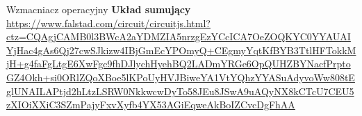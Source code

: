 \begin{frame}{Wzmacniacz operacyjny}
	\textbf{Układ sumujący}\\
	\url{https://www.falstad.com/circuit/circuitjs.html?ctz=CQAgjCAMB0l3BWcA2aYDMZIA5nrzgEzYCcICA7OeZOQKYC0YYAUAIYjHac4gAs6Qj27cwSJkizw4IBjGmEcYPOmyQ+CEgmyYqtKfBYB3TtlHFTokkMjH+g4faFgLtgE6XwFgc9fhDJlychHyehBQ2LADmYRGe6OpQUHZBYNacfPrptoGZ4Okh+si0ORlZQoXBoe5lKPoUyHVJBiweYA1VtYQhzYYASuAdyvoWw808tEglUNAILAPtjd2hLtzLSRW0NkkwcwDyTo58JEu8JSwA9uAQyNX8kCTcU7CEU5zXIOiXXiC3SZmPajyFxvXyfb4YX53AGiEqweAkBoIZCvcDgFhAA}
\end{frame}